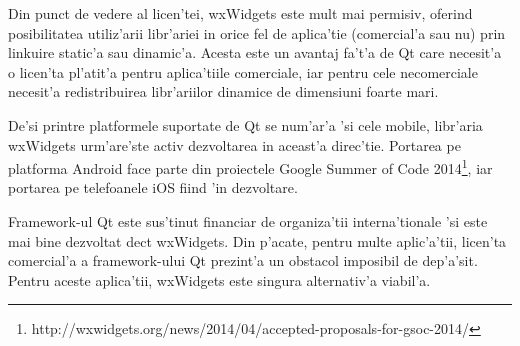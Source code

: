 Din punct de vedere al licen'tei, wxWidgets este mult mai permisiv, oferind posibilitatea utiliz'arii libr'ariei in orice fel de aplica'tie (comercial'a sau nu) prin linkuire static'a sau dinamic'a. Acesta este un avantaj fa't'a de Qt care necesit'a o licen'ta pl'atit'a pentru aplica'tiile comerciale, iar pentru cele necomerciale necesit'a redistribuirea libr'ariilor dinamice de dimensiuni foarte mari.

De'si printre platformele suportate de Qt se num'ar'a 'si cele mobile, libr'aria wxWidgets urm'are'ste activ dezvoltarea in aceast'a direc'tie. Portarea pe platforma Android face parte din proiectele Google Summer of Code 2014\footnote{http://wxwidgets.org/news/2014/04/accepted-proposals-for-gsoc-2014/}, iar portarea pe telefoanele iOS fiind 'in dezvoltare.

Framework-ul Qt este sus'tinut financiar de organiza'tii interna'tionale 'si este mai bine dezvoltat dec{\ia}t wxWidgets. Din p'acate, pentru multe aplic'a'tii, licen'ta comercial'a a framework-ului Qt prezint'a un obstacol imposibil de dep'a'sit. Pentru aceste aplica'tii, wxWidgets este singura alternativ'a viabil'a.






